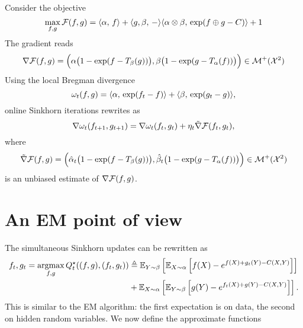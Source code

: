 \documentclass[a4paper, 10pt]{article}
\begin{document}
Consider the objective
\begin{equation}
    \max_{f, g} \mathcal{F}(f, g) = \langle \alpha,\,f\rangle + \langle g, \beta,\,-\rangle
     \langle \alpha \otimes \beta,\,\exp(f \oplus g - C)\rangle + 1
\end{equation}
The gradient reads
\begin{equation}
    \nabla \mathcal{F}(f, g) = \Big(\alpha\big(1 - \exp(f - T_\beta(g))\big), \beta\big(1 - \exp(g - T_\alpha(f))\big)\Big)
     \in \mathcal{M}^+(\mathcal{X}^2)
\end{equation}
Using the local Bregman divergence
\begin{equation}
    \omega_t(f, g) = \langle \alpha,\,\exp(f_t - f)\rangle + \langle \beta,\,\exp(g_t - g)\rangle,
\end{equation}
online Sinkhorn iterations rewrites as
\begin{equation}
    \nabla \omega_t(f_{t+1}, g_{t+1}) = \nabla \omega_t(f_t, g_t) + \eta_t \tilde \nabla \mathcal{F}(f_t, g_t),
\end{equation}
where 
\begin{equation}
    \tilde \nabla \mathcal{F}(f, g) = \Big(\hat \alpha_t \big(1 - \exp(f - T_\beta(g))\big), 
    \hat \beta_t \big(1 - \exp(g - T_\alpha(f))\big)\Big)
    \in \mathcal{M}^+(\mathcal{X}^2)
\end{equation}
is an unbiased estimate of $\nabla \mathcal{F}(f, g)$.

\section{An EM point of view}
The simultaneous Sinkhorn updates can be rewritten as
\begin{align}
    f_t, g_t = \operatorname*{argmax}_{f, g} Q_t^\star((f, g), (f_t, g_t)) 
    &\triangleq \mathbb{E}_{Y \sim \beta} \left[ \mathbb{E}_{X \sim \alpha} \left[
     f(X) - e^{f(X) + g_t(Y) - C(X, Y)} \right] \right] \\
     &+
     \mathbb{E}_{X \sim \alpha} \left[ \mathbb{E}_{Y \sim \beta} \left[
     g(Y) - e^{f_t(X) + g(Y) - C(X, Y)} \right] \right].
\end{align}
This is similar to the EM algorithm: the first expectation is on data, the second on hidden random variables.
We now define the approximate functions
\end{document}
